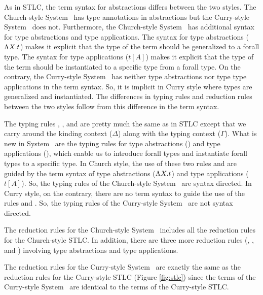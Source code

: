 As in STLC, the term syntax for abstractions differs between the two styles.
The Church-style System \F\ has type annotations in abstractions but
the Curry-style System \F\ does not. Furthermore, the Church-style System \F\
has additional syntax for type abstractions and type applications. The syntax
for type abstractions ($\Lambda X.t$) makes it explicit that the type of the term
should be generalized to a forall type. The syntax for type applications
($t[A]$) makes it explicit that the type of the term should be instantiated to
a specific type from a forall type. On the contrary, the Curry-style System \F\
has neither type abstractions nor type type applications in the term syntax.
So, it is implicit in Curry style where types are generalized and instantiated.
The differences in typing rules and reduction rules between the two styles
follow from this difference in the term syntax.

The typing rules , , and  are
pretty much the same as in STLC except that we carry around the kinding context
($\Delta$) along with the typing context ($\Gamma$). What is new in System \F\
are the typing rules for type abstractions () and
type applications (\rulename{TyApp}), which enable us to introduce
forall types and instantiate forall types to a specific type.
In Church style, the use of these two rules \rulename{TyAbs} and
\rulename{TyAbs} are guided by the term syntax of type abstractions
($\Lambda X.t$) and type applications ($t[A]$). So, the typing rules of
the Church-style System \F\ are syntax directed. In Curry style,
on the contrary, there are no term syntax to guide the use of the rules
\rulename{TyAbs} and \rulename{TyApp}. So, the typing rules of
the Curry-style System \F\ are not syntax directed.

The reduction rules for the Church-style System \F\ includes all
the reduction rules for the Church-style STLC. In addition,  there
are three more reduction rules (, ,
and \rulename{RedTyApp}) involving type abstractions and type applications.

The reduction rules for the Curry-style System \F\ are exactly the same as
the reduction rules for the Curry-style STLC (Figure \ref{fig:stlc}) since
the terms of the Curry-style System \F\ are identical to 
the terms of the Curry-style STLC.

